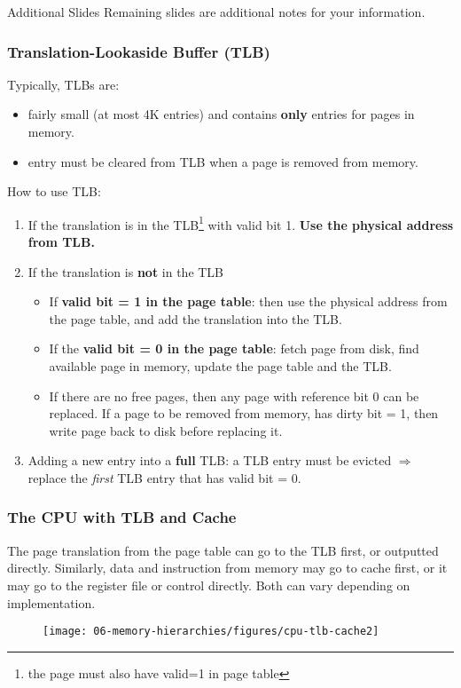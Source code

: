  \begin{frame}{Additional Slides}
     Remaining slides are additional notes for your information.
 \end{frame}

\begin{frame}[fragile]\frametitle{Translation-Lookaside Buffer (TLB)}
{\footnotesize
 Typically, TLBs are:
\begin{itemize}
    \item  fairly small (at most 4K entries) and contains \textbf{only} entries for pages in
memory.
\item entry must be cleared from TLB when a page is removed from memory.
\end{itemize}
How to use TLB:
\begin{enumerate}
\item If the translation is in the TLB\footnote{the page must also have valid=1 in page table} with valid bit 1. \textbf{Use the physical address from TLB.}
\item If the translation is \textbf{not} in the TLB
\begin{itemize}
\item If \textbf{valid bit = 1 in the page table}: then use the physical address from the page table, and add the translation into the TLB.

\item If the \textbf{valid bit = 0 in the page table}: fetch page from disk, find available page in memory, update the page table and the TLB.
\item If there are no free pages, then any page with reference bit 0 can be replaced. If a page to be removed from memory, has dirty bit = 1, then write page back to disk before replacing it.
\end{itemize}
\item Adding a new entry into a \textbf{full} TLB: a TLB entry must be evicted $\Rightarrow$ replace the \emph{first} TLB entry that has valid bit = 0.
\end{enumerate}
}
\end{frame}


\begin{frame}[fragile]\frametitle{The CPU with TLB and Cache}
The page translation from the page table can go to the TLB first, or outputted directly. Similarly, data and instruction from memory may go to cache first, or it may go to the register file or control directly. Both can vary depending on implementation.
\begin{figure}[H]
\centering
	{\texttt{[image: 06-memory-hierarchies/figures/cpu-tlb-cache2]}}
\end{figure}

\end{frame}


